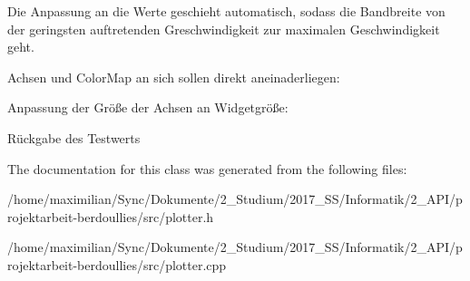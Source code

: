 Die Anpassung an die Werte geschieht automatisch, sodass die Bandbreite von der geringsten auftretenden Greschwindigkeit zur maximalen Geschwindigkeit geht.

Achsen und Color\+Map an sich sollen direkt aneinaderliegen\+:

Anpassung der Größe der Achsen an Widgetgröße\+:

Rückgabe des Testwerts 

The documentation for this class was generated from the following files\+:\begin{DoxyCompactItemize}
\item 
/home/maximilian/\+Sync/\+Dokumente/2\+\_\+\+Studium/2017\+\_\+\+S\+S/\+Informatik/2\+\_\+\+A\+P\+I/projektarbeit-\/berdoullies/src/plotter.\+h\item 
/home/maximilian/\+Sync/\+Dokumente/2\+\_\+\+Studium/2017\+\_\+\+S\+S/\+Informatik/2\+\_\+\+A\+P\+I/projektarbeit-\/berdoullies/src/plotter.\+cpp\end{DoxyCompactItemize}
